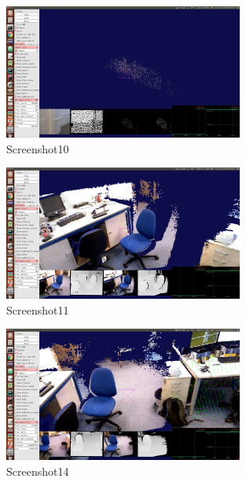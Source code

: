 \documentclass[12pt,twoside]{article}
\begin{document}
\begin{figure}[h]
    \centering
    \includegraphics[width=0.7\textwidth]{figures/Screenshot10}
    \caption{Screenshot10}
    \label{fig:Screenshot10}
\end{figure}

\begin{figure}[h]
    \centering
    \includegraphics[width=0.7\textwidth]{figures/Screenshot11}
    \caption{Screenshot11}
    \label{fig:Screenshot11}
\end{figure}


\begin{figure}[h]
    \centering
    \includegraphics[width=0.7\textwidth]{figures/Screenshot14}
    \caption{Screenshot14}
    \label{fig:Screenshot14}
\end{figure}
\end{document}
